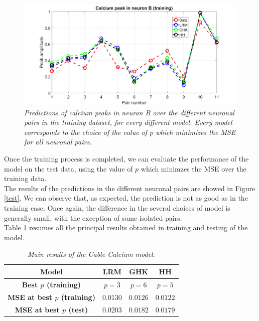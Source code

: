 \documentclass[12pt, a4paper]{report}
\begin{document}
\begin{figure}[H]
	\begin{center}
		\hspace*{-1.5 cm}
		\includegraphics[scale=0.5]{training.png} 
	\end{center} 
	\caption{\textit{Predictions of calcium peaks in neuron B over the different neuronal pairs in the training dataset, for every different model. Every model corresponds to the choice of the value of $p$ which minimizes the MSE for all neuronal pairs.}}
	\label{training}
\end{figure}


Once the training process is completed, we can evaluate the performance of the model on the test data, using the value of $p$ which minimzes the MSE over the training data.\\
The results of the predictions in the different neuronal pairs are showed in Figure \ref{test}. We can observe that, as expected, the prediction is not as good as in the training case. Once again, the difference in the several choices of model is generally small, with the exception of some isolated pairs.\\
Table \ref{results} resumes all the principal results obtained in training and testing of the model.


\begin{table} [H]
	\centering
	\begin{tabular}{ |c|c|c|c| } 
		
		\hline
		\textbf{Model} & \textbf{LRM} & \textbf{GHK} & \textbf{HH} \\
		\hline
		\textbf{Best $p$ (training)}  & $p=3$ & $p=6$ & $p=5$ \\
		\hline
		\textbf{MSE at best $p$ (training)}  & $0.0130$ & $0.0126$ & $0.0122$  \\
		\hline
		\textbf{MSE at best $p$ (test)}  & $0.0203$ & $0.0182$ & $0.0179$  \\
		\hline
		
		
	\end{tabular} \caption{\textit{Main results of the Cable-Calcium model}.\label{results}}
\end{table}
\end{document}
